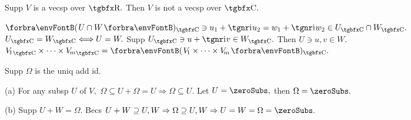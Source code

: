 \BulletPointX{}\;\;Supp $V$ is a vecsp over $\Rbb.$ Then $V$ is not a vecsp over $\Cbb.$\vspace{-4pt}
\SepLine


\BulletPointX{}\par
{} \qquad {}\PfEnd
{}\PfEnd{}
\PfEnd
\BulletPointX{ \quad}$\Par{U\cap W}{_\Cbb}\ni u_1+\i\:\!u_2=w_1+\i\:\!w_2\in U_\Cbb\cap W_\Cbb.$\PfEnd
\BulletPointX{ \quad}$U_\Cbb=W_\Cbb\Longleftrightarrow U=W.$ \;Supp $U_\Cbb\ni u+\i\:\!v\in W_\Cbb.$ Then $U\ni u,v\in W.$\PfEnd
\BulletPointX{ \quad}${V_{\!1}}_\Cbb\times\cdots\times{V_{\!m}}_\Cbb=\Par{V_{\!1}\times\cdots\times V_{\!m}}{_\Cbb}.$\PfEnd
\SepLine

Supp $\Omega$ is the uniq add id.\par\quad
(a) For any subsp $U$ of $V,$ $\Omega\subseteq U+\Omega=U\Rightarrow\Omega\subseteq U$. Let $U=\zeroSubs,$ then $\Omega=\zeroSubs.$\par\quad
(b) Supp $U+W=\Omega.$ Becs $U+W\supseteq U,W\Rightarrow \Omega\supseteq U,W\Rightarrow U=W=\Omega=\zeroSubs.$\PfEnd
\SepLine

